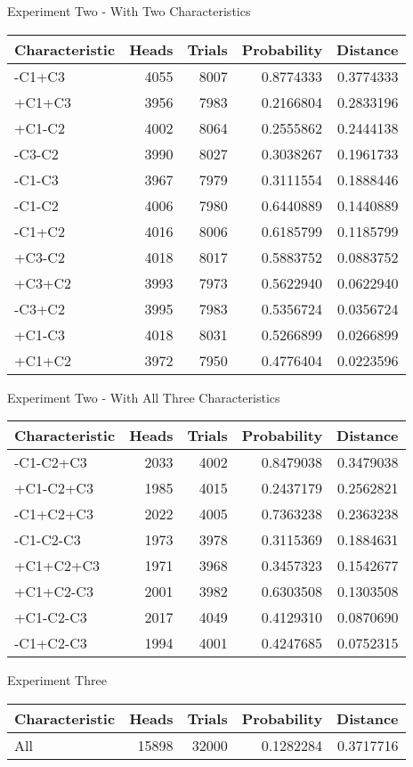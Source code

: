 \documentclass[
  ignorenonframetext,
]{beamer}
\renewcommand{\,}{\text{, }}
\begin{document}
\begin{frame}{Experiment Two - With Two Characteristics}
\protect\hypertarget{experiment-two---with-two-characteristics}{}

\begin{longtable}[]{@{}lrrrr@{}}
\toprule
Characteristic & Heads & Trials & Probability & Distance\tabularnewline
\midrule
\endhead
-C1+C3 & 4055 & 8007 & 0.8774333 & 0.3774333\tabularnewline
+C1+C3 & 3956 & 7983 & 0.2166804 & 0.2833196\tabularnewline
+C1-C2 & 4002 & 8064 & 0.2555862 & 0.2444138\tabularnewline
-C3-C2 & 3990 & 8027 & 0.3038267 & 0.1961733\tabularnewline
-C1-C3 & 3967 & 7979 & 0.3111554 & 0.1888446\tabularnewline
-C1-C2 & 4006 & 7980 & 0.6440889 & 0.1440889\tabularnewline
-C1+C2 & 4016 & 8006 & 0.6185799 & 0.1185799\tabularnewline
+C3-C2 & 4018 & 8017 & 0.5883752 & 0.0883752\tabularnewline
+C3+C2 & 3993 & 7973 & 0.5622940 & 0.0622940\tabularnewline
-C3+C2 & 3995 & 7983 & 0.5356724 & 0.0356724\tabularnewline
+C1-C3 & 4018 & 8031 & 0.5266899 & 0.0266899\tabularnewline
+C1+C2 & 3972 & 7950 & 0.4776404 & 0.0223596\tabularnewline
\bottomrule
\end{longtable}

\end{frame}

\begin{frame}{Experiment Two - With All Three Characteristics}
\protect\hypertarget{experiment-two---with-all-three-characteristics}{}

\begin{longtable}[]{@{}lrrrr@{}}
\toprule
Characteristic & Heads & Trials & Probability & Distance\tabularnewline
\midrule
\endhead
-C1-C2+C3 & 2033 & 4002 & 0.8479038 & 0.3479038\tabularnewline
+C1-C2+C3 & 1985 & 4015 & 0.2437179 & 0.2562821\tabularnewline
-C1+C2+C3 & 2022 & 4005 & 0.7363238 & 0.2363238\tabularnewline
-C1-C2-C3 & 1973 & 3978 & 0.3115369 & 0.1884631\tabularnewline
+C1+C2+C3 & 1971 & 3968 & 0.3457323 & 0.1542677\tabularnewline
+C1+C2-C3 & 2001 & 3982 & 0.6303508 & 0.1303508\tabularnewline
+C1-C2-C3 & 2017 & 4049 & 0.4129310 & 0.0870690\tabularnewline
-C1+C2-C3 & 1994 & 4001 & 0.4247685 & 0.0752315\tabularnewline
\bottomrule
\end{longtable}

\end{frame}

\begin{frame}{Experiment Three}
\protect\hypertarget{experiment-three}{}

\begin{longtable}[]{@{}lrrrr@{}}
\toprule
Characteristic & Heads & Trials & Probability & Distance\tabularnewline
\midrule
\endhead
All & 15898 & 32000 & 0.1282284 & 0.3717716\tabularnewline
\bottomrule
\end{longtable}

\end{frame}
\end{document}
